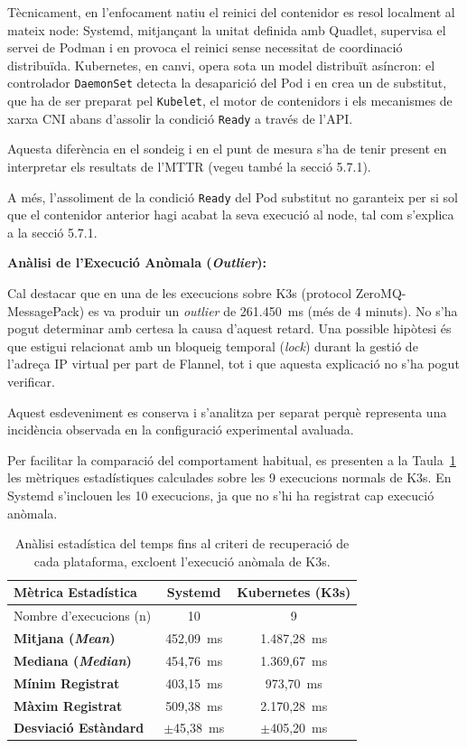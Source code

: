 Tècnicament, en l'enfocament natiu el reinici del contenidor es resol localment al mateix node: Systemd, mitjançant la unitat definida amb Quadlet, supervisa el servei de Podman i en provoca el reinici sense necessitat de coordinació distribuïda.
Kubernetes, en canvi, opera sota un model distribuït asíncron: el controlador \texttt{DaemonSet} detecta la desaparició del Pod i en crea un de substitut, que ha de ser preparat pel \texttt{Kubelet}, el motor de contenidors i els mecanismes de xarxa CNI abans d'assolir la condició \texttt{Ready} a través de l'API.

Aquesta diferència en el sondeig i en el punt de mesura s'ha de tenir present en interpretar els resultats de l'MTTR (vegeu també la secció 5.7.1).

A més, l'assoliment de la condició \texttt{Ready} del Pod substitut no garanteix per si sol que el contenidor anterior hagi acabat la seva execució al node, tal com s'explica a la secció 5.7.1.

\textbf{Anàlisi de l'Execució Anòmala (\textit{Outlier}):}

Cal destacar que en una de les execucions sobre K3s (protocol ZeroMQ-MessagePack) es va produir un \textit{outlier} de 261.450~ms (més de 4 minuts). 
No s'ha pogut determinar amb certesa la causa d'aquest retard. 
Una possible hipòtesi és que estigui relacionat amb un bloqueig temporal (\textit{lock}) durant la gestió de l'adreça IP virtual per part de Flannel, tot i que aquesta explicació no s'ha pogut verificar.

Aquest esdeveniment es conserva i s'analitza per separat perquè representa una incidència observada en la configuració experimental avaluada.

Per facilitar la comparació del comportament habitual, es presenten a la Taula~\ref{tab:estadistiques_mttr} les mètriques estadístiques calculades sobre les 9 execucions normals de K3s. 
En Systemd s'inclouen les 10 execucions, ja que no s'hi ha registrat cap execució anòmala.

\begin{table}[H]
    \centering
    \renewcommand{\arraystretch}{1.2}
    \begin{tabular}{lcc}
        \toprule
        \textbf{Mètrica Estadística} & \textbf{Systemd} & \textbf{Kubernetes (K3s)} \\
        \midrule
        Nombre d'execucions (n) & 10 & 9 \\
        \textbf{Mitjana (\textit{Mean})} & 452,09~ms & 1.487,28~ms \\
        \textbf{Mediana (\textit{Median})} & 454,76~ms & 1.369,67~ms \\
        \textbf{Mínim Registrat} & 403,15~ms & 973,70~ms \\
        \textbf{Màxim Registrat} & 509,38~ms & 2.170,28~ms \\
        \textbf{Desviació Estàndard} & $\pm$45,38~ms & $\pm$405,20~ms \\
        \bottomrule
    \end{tabular}
    \caption{Anàlisi estadística del temps fins al criteri de recuperació de cada plataforma, excloent l'execució anòmala de K3s.}
    \label{tab:estadistiques_mttr}
\end{table}

